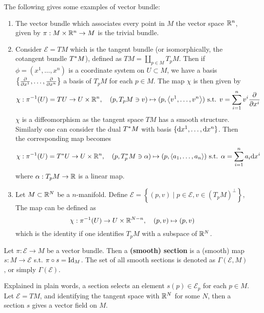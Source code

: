 \documentclass{article}
\begin{document}
\begin{example}
    The following gives some examples of vector bundle:
    \begin{enumerate}
        \item The vector bundle which associates every point in $M$ the vector space $\mathbb{R}^n$, given by $\pi: M \times \mathbb{R}^n \to M$ is the trivial bundle. 
        \item Consider $\mathcal{E} = TM$ which is the tangent bundle (or isomorphically, the cotangent bundle $T^{\ast}M$), defined as $TM = \coprod_{p \in M} T_p M$. Then if $\phi = (x^1, \dots, x^n)$ is a coordinate system on $U \subset M$, we have a basis $\left\{ \frac{\partial }{\partial x^1}, \dots, \frac{\partial }{\partial x^n} \right\}$ a basis of $T_p M$ for each $p \in M$. The map $\chi$ is then given by 
        \[
            \chi: \pi^{-1}(U) = TU \to U \times \mathbb{R}^n, \quad (p, T_p M \ni v) \mapsto (p, \left\langle v^1, \dots, v^n \right\rangle) \text{ s.t. } v = \sum_{i = 1}^{n} v^i \frac{\partial }{\partial x^i}
        \]
        $\chi$ is a diffeomorphism as the tangent space $TM$ has a smooth structure. Similarly one can consider the dual $T^{\ast}M$ with basis $\{\mathrm{d} x^1, \dots, \mathrm{d} x^n\}$. Then the corresponding map becomes
        \[
            \chi: \pi^{-1}(U) = T^{\ast}U \to U \times \mathbb{R}^n, \quad (p, T_p^{\ast}M \ni \alpha) \mapsto (p, \left\langle a_1, \dots, a_n \right\rangle) \text{ s.t. } \alpha = \sum_{i = 1}^n a_i\mathrm{d} x^i
        \]
        where $\alpha: T_p M \to \mathbb{R}$ is a linear map. 
        \item Let $M \subset \mathbb{R}^N$ be a $n$-manifold. Define $\mathcal{E} = \left\{ (p, v) \mid p \in \mathcal{E}, v \in (T_pM)^{\perp} \right\}$, The map can be defined as
        \[
            \chi: \pi^{-1}(U) \to U \times \mathbb{R}^{N - n}, \quad (p, v) \mapsto (p, v)
        \]
        which is the identity if one identifies $T_p M$ with a subspace of $\mathbb{R}^N$.
    \end{enumerate}
\end{example}

\begin{definition}[Section]
    Let $\pi: \mathcal{E} \to M$ be a vector bundle. Then a \textbf{(smooth) section} is a (smooth) map $s: M \to \mathcal{E}$ s.t. $\pi \circ s = \mathrm{Id}_M$. The set of all smooth sections is denoted as $\Gamma(\mathcal{E}, M)$, or simply $\Gamma(\mathcal{E})$.
\end{definition}

\begin{remark}
    Explained in plain words, a section selects an element $s(p) \in \mathcal{E}_p$ for each $p \in M$. Let $\mathcal{E} = TM$, and identifying the tangent space with $\mathbb{R}^N$ for some $N$, then a section $s$ gives a vector field on $M$.
\end{remark}
\end{document}
